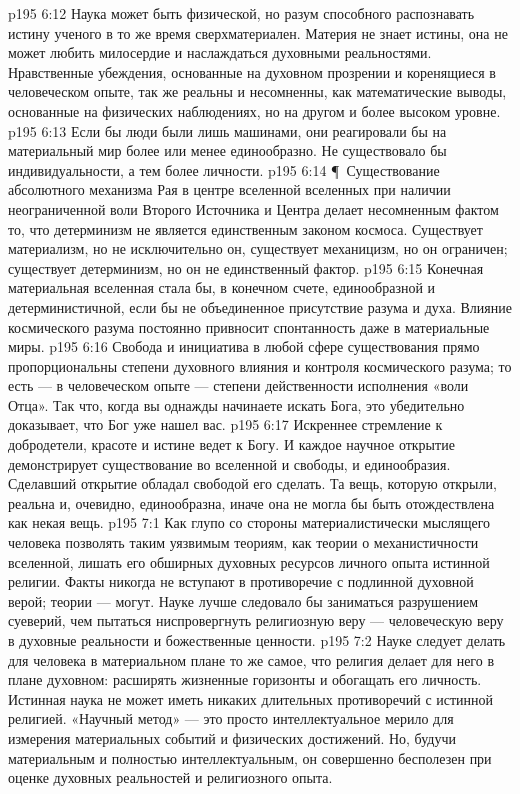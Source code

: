 \vs p195 6:12 Наука может быть физической, но разум способного распознавать истину ученого в то же время сверхматериален. Материя не знает истины, она не может любить милосердие и наслаждаться духовными реальностями. Нравственные убеждения, основанные на духовном прозрении и коренящиеся в человеческом опыте, так же реальны и несомненны, как математические выводы, основанные на физических наблюдениях, но на другом и более высоком уровне.
\vs p195 6:13 Если бы люди были лишь машинами, они реагировали бы на материальный мир более или менее единообразно. Не существовало бы индивидуальности, а тем более личности.
\vs p195 6:14 \P\ Существование абсолютного механизма Рая в центре вселенной вселенных при наличии неограниченной воли Второго Источника и Центра делает несомненным фактом то, что детерминизм не является единственным законом космоса. Существует материализм, но не исключительно он, существует механицизм, но он ограничен; существует детерминизм, но он не единственный фактор.
\vs p195 6:15 Конечная материальная вселенная стала бы, в конечном счете, единообразной и детерминистичной, если бы не объединенное присутствие разума и духа. Влияние космического разума постоянно привносит спонтанность даже в материальные миры.
\vs p195 6:16 Свобода и инициатива в любой сфере существования прямо пропорциональны степени духовного влияния и контроля космического разума; то есть --- в человеческом опыте --- степени действенности исполнения «воли Отца». Так что, когда вы однажды начинаете искать Бога, это убедительно доказывает, что Бог уже нашел вас.
\vs p195 6:17 Искреннее стремление к добродетели, красоте и истине ведет к Богу. И каждое научное открытие демонстрирует существование во вселенной и свободы, и единообразия. Сделавший открытие обладал свободой его сделать. Та вещь, которую открыли, реальна и, очевидно, единообразна, иначе она не могла бы быть отождествлена как некая вещь.
\vs p195 7:1 Как глупо со стороны материалистически мыслящего человека позволять таким уязвимым теориям, как теории о механистичности вселенной, лишать его обширных духовных ресурсов личного опыта истинной религии. Факты никогда не вступают в противоречие с подлинной духовной верой; теории --- могут. Науке лучше следовало бы заниматься разрушением суеверий, чем пытаться ниспровергнуть религиозную веру --- человеческую веру в духовные реальности и божественные ценности.
\vs p195 7:2 Науке следует делать для человека в материальном плане то же самое, что религия делает для него в плане духовном: расширять жизненные горизонты и обогащать его личность. Истинная наука не может иметь никаких длительных противоречий с истинной религией. «Научный метод» --- это просто интеллектуальное мерило для измерения материальных событий и физических достижений. Но, будучи материальным и полностью интеллектуальным, он совершенно бесполезен при оценке духовных реальностей и религиозного опыта.
